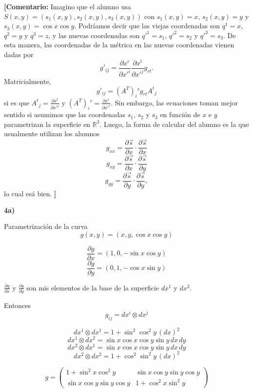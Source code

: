 \documentclass[11pt,spanish]{article}
\newcommand{\comentario}[1]{{\color{red} {\bf [Comentario:} #1 {\bf ]}}}
\begin{document}
\comentario{
Imagino que el alumno usa $S(x,y) = (s_1(x,y),s_2(x,y),s_3(x,y))$ con $s_1(x,y)=x$, $s_2(x,y)=y$ y $s_3(x,y)=\cos x\cos y$.
Podr\'iamos decir que las viejas coordenadas son $q^1=x$, $q^2=y$  y $q^3=z$, y las nuevas coordenadas son $q'^1=s_1$, $q'^2=s_2$ y $q'^3=s_3$.
De esta manera, las coordenadas de la m\'etrica en las nuevas coordenadas vienen dadas por
$$
g'_{ij}
=
\frac{\partial x^r}{\partial x'^i}
\frac{\partial x^t}{\partial x'^j}
g_{rt}
.
$$
Matricialmente,
$$
g'_{ij}
=
(A^T)_i{}^r g_{rt} A^t{}_j
$$
si es que
$A^t{}_j=\frac{\partial x^t}{\partial x'^j}$ 
y 
$(A^T)_i{}^r = \frac{\partial x^r}{\partial x'^i}$.
Sin embargo, las ecuaciones toman mejor sentido si asumimos que las coordenadas $s_1$, $s_2$ y $s_3$ en funci\'on de $x$ e $y$ parametrizan la superficie en $\mathbb{R}^3$. 
Luego, la forma de calcular del alumno es la que usualmente utilizan los alumnos
$$
g_{xx} = \frac{\partial \vec{s}}{\partial x} \cdot \frac{\partial \vec{s}}{\partial x}
$$
$$
g_{xy} = \frac{\partial \vec{s}}{\partial x} \cdot \frac{\partial \vec{s}}{\partial y}
$$
$$
g_{yy} = \frac{\partial \vec{s}}{\partial y} \cdot \frac{\partial \vec{s}}{\partial y},
$$
lo cual es\'a bien.
}


\vspace{0.5cm}

\vspace{0.5cm}
{\bf 4a)}
\vspace{0.5cm}

Parametrizaci\'on de la curva
$$
g(x,y) = (x,y,\cos x\cos y)
$$

$$
\frac{\partial g}{\partial x}
=
(1,0,-\sin x\cos y)
$$
$$
\frac{\partial g}{\partial y}
=
(0,1,-\cos x\sin y)
$$

$\frac{\partial g}{\partial x}$ y $\frac{\partial g}{\partial y}$ son mis elementos de la base de la superficie $dx^1$ y $dx^2$.

Entonces
$$
g_{ij} = dx^i \otimes dx^j
$$

$$
dx^1 \otimes dx^1 
=
1+\sin^2 \cos^2 y\, (dx)^2
$$
$$
dx^1 \otimes dx^2 
=
\sin x\cos x\cos y\sin y\, dx\, dy
$$
$$
dx^2 \otimes dx^1
=
\sin x\cos x\cos y\sin y\, dx\, dy
$$
$$
dx^2 \otimes dx^2 
=
1+\cos^2 \sin^2 y\, (dx)^2
$$

$$
g
=
\begin{pmatrix}
1+\sin^2 x\cos^2 y & \sin x\cos y\sin y\cos y \\
\sin x\cos y\sin y\cos y & 1+\cos^2 x\sin^2 y
\end{pmatrix}
$$
\end{document}
